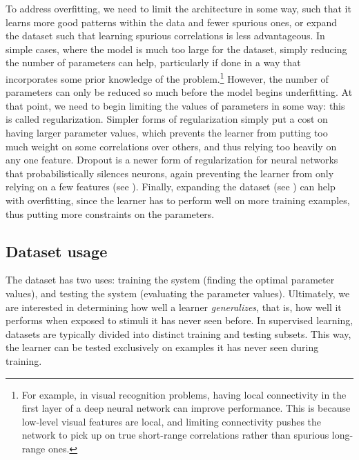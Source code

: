 To address overfitting,
we need to limit the architecture in some way,
such that it learns more good patterns within the data and fewer spurious ones,
or expand the dataset such that learning spurious correlations is less advantageous.
In simple cases, where the model is much too large for the dataset,
simply reducing the number of parameters can help,
particularly if done in a way that incorporates some prior knowledge of the problem.\footnote{
  For example, in visual recognition problems,
  having local connectivity in the first layer of a deep neural network
  can improve performance.
  This is because low-level visual features are local,
  and limiting connectivity pushes the network to pick up on
  true short-range correlations rather than spurious long-range ones.}
However, the number of parameters can only be reduced so much
before the model begins underfitting.
At that point, we need to begin limiting the values of parameters in some way:
this is called regularization.
Simpler forms of regularization simply put a cost
on having larger parameter values,
which prevents the learner from putting too much weight
on some correlations over others,
and thus relying too heavily on any one feature.
Dropout is a newer form of regularization for neural networks
that probabilistically silences neurons,
again preventing the learner from only relying on a few features (see ).
Finally, expanding the dataset (see )
can help with overfitting,
since the learner has to perform well on more training examples,
thus putting more constraints on the parameters.


\subsection{Dataset usage}

The dataset has two uses:
training the system (finding the optimal parameter values),
and testing the system (evaluating the parameter values).
Ultimately, we are interested in determining how well a learner \emph{generalizes},
that is, how well it performs when exposed to stimuli it has never seen before.
In supervised learning, datasets are typically divided into
distinct training and testing subsets.
This way, the learner can be tested exclusively on examples
it has never seen during training.

